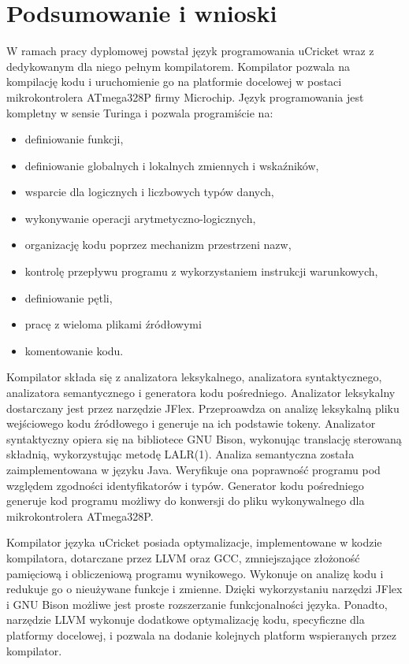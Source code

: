 \chapter{Podsumowanie i wnioski}
\label{ch:07}
W ramach pracy dyplomowej powstał język programowania uCricket wraz z dedykowanym dla niego pełnym kompilatorem. Kompilator pozwala na kompilację kodu i uruchomienie go na platformie docelowej w postaci mikrokontrolera ATmega328P firmy Microchip.
Język programowania jest kompletny w sensie Turinga i pozwala programiście na:
\begin{itemize}
\item definiowanie funkcji,
\item definiowanie globalnych i lokalnych zmiennych i wskaźników,
\item wsparcie dla logicznych i liczbowych typów danych,
\item wykonywanie operacji arytmetyczno-logicznych,
\item organizację kodu poprzez mechanizm przestrzeni nazw,
\item kontrolę przepływu programu z wykorzystaniem instrukcji warunkowych,
\item definiowanie pętli,
\item pracę z wieloma plikami źródłowymi
\item komentowanie kodu.
\end{itemize}

Kompilator składa się z analizatora leksykalnego, analizatora syntaktycznego, analizatora semantycznego i generatora kodu pośredniego.
Analizator leksykalny dostarczany jest przez narzędzie JFlex. Przeproawdza on analizę leksykalną pliku wejściowego kodu źródłowego i generuje na ich podstawie tokeny. Analizator syntaktyczny opiera się na bibliotece GNU Bison, wykonując translację sterowaną składnią, wykorzystując metodę LALR(1). Analiza semantyczna została zaimplementowana w języku Java. Weryfikuje ona poprawność programu pod względem zgodności identyfikatorów i typów. Generator kodu pośredniego generuje kod programu możliwy do konwersji do pliku wykonywalnego dla mikrokontrolera ATmega328P.

Kompilator języka uCricket posiada optymalizacje, implementowane w kodzie kompilatora, dotarczane przez LLVM oraz GCC, zmniejszające złożoność pamięciową i obliczeniową programu wynikowego. Wykonuje on analizę kodu i redukuje go o nieużywane funkcje i zmienne. 
Dzięki wykorzystaniu narzędzi JFlex i GNU Bison możliwe jest proste rozszerzanie funkcjonalności języka. Ponadto, narzędzie LLVM wykonuje dodatkowe optymalizację kodu, specyficzne dla platformy docelowej, i pozwala na dodanie kolejnych platform wspieranych przez kompilator.

